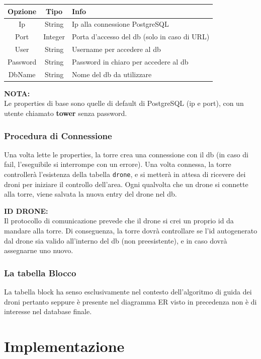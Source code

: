 \documentclass[a4paper, 11pt]{article}
\begin{document}
\begin{longtable}{|c|c|p{}|}
\hline
\textbf{Opzione} & \textbf{Tipo} & \textbf{Info} \\
\hline
Ip & String & Ip alla connessione PostgreSQL \\
\hline
Port & Integer & Porta d'accesso del db (solo in caso di URL) \\
\hline
User & String & Username per accedere al db \\
\hline
Password & String & Password in chiaro per accedere al db \\
\hline
DbName & String & Nome del db da utilizzare \\
\hline
\end{longtable}

\textbf{NOTA:} \\
Le properties di base sono quelle di default di PostgreSQL (ip e port), con un utente chiamato \textbf{tower} senza password.

\subsubsection{Procedura di Connessione}

Una volta lette le properties, la torre crea una connessione con il db (in caso di fail, l'eseguibile si interrompe con un errore).
Una volta connessa, la torre controllerà l'esistenza della tabella \texttt{drone}, e si metterà in attesa di ricevere dei droni per iniziare il controllo dell'area.
Ogni qualvolta che un drone si connette alla torre, viene salvata la nuova entry del drone nel db.

\textbf{ID DRONE:} \\
Il protocollo di comunicazione prevede che il drone si crei un proprio id da mandare alla torre.
Di conseguenza, la torre dovrà controllare se l'id autogenerato dal drone sia valido all'interno del db (non preesistente), e in caso dovrà assegnarne uno nuovo.
\subsubsection{La tabella Blocco}
La tabella block ha senso esclusivamente nel contesto dell'algoritmo di guida dei droni pertanto seppure è presente nel diagramma ER visto in precedenza non è di interesse nel database finale.

\newpage
\section{Implementazione}
\end{document}
